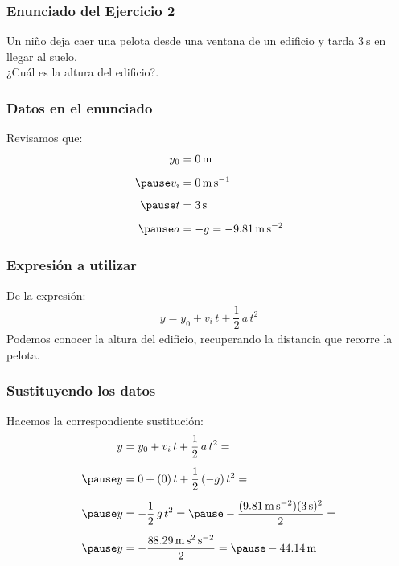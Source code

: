 \documentclass[14pt]{beamer}
\begin{document}
\begin{frame}
\frametitle{Enunciado del Ejercicio 2}
Un niño deja caer una pelota desde una ventana de un edificio y tarda $\SI{3}{\second}$ en llegar al suelo. 
\\
\bigskip
\pause
¿Cuál es la altura del edificio?.
\end{frame}
\begin{frame}
\frametitle{Datos en el enunciado}
Revisamos que:
\begin{eqnarray*}
\begin{aligned}
y_{0} &= \SI{0}{\meter} \\[0.5em] \pause 
v_{i} &= \SI{0}{\meter\per\second} \\[0.5em] \pause
t &= \SI{3}{\second} \\[0.5em] \pause
a &= - g = - \SI{9.81}{\meter\per\square\second}
\end{aligned}
\end{eqnarray*}
\end{frame}
\begin{frame}
\frametitle{Expresión a utilizar}
De la expresión:
\pause
\begin{align*}
y = y_{0} + v_{i} \, t + \dfrac{1}{2} \, a \, t^{2}
\end{align*}
Podemos conocer la altura del edificio, recuperando la distancia que recorre la pelota.
\end{frame}
\begin{frame}
\frametitle{Sustituyendo los datos}
Hacemos la correspondiente sustitución:
\pause
\begin{eqnarray*}
\begin{aligned}
y &= y_{0} + v_{i} \, t + \dfrac{1}{2} \, a \, t^{2} = \\[0.5em] \pause
y &= 0 + (0) \, t + \dfrac{1}{2} \, (- g) \, t^{2} = \\[0.5em] \pause
y &= - \dfrac{1}{2} \, g \, t^{2} = \pause - \dfrac{(\SI{9.81}{\meter\per\square\second}) (\SI{3}{\second})^{2}}{2} = \\[0.5em] \pause
y &= - \dfrac{\SI{88.29}{\meter\square\second\per\square\second}}{2} = \pause - \SI{44.14}{\meter}
\end{aligned}
\end{eqnarray*}
\end{frame}
\end{document}
